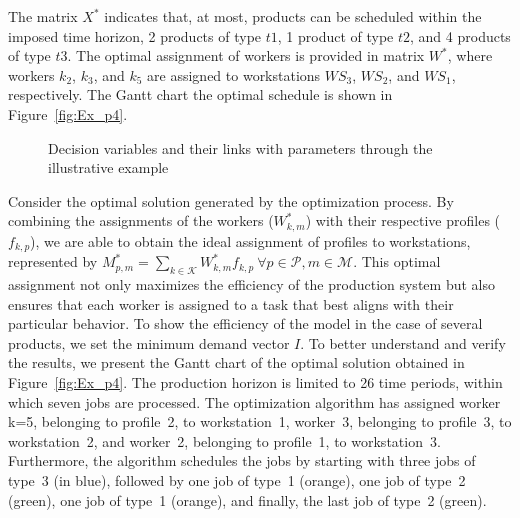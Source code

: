 \documentclass[review,12pt, 3p, times]{elsarticle}
\begin{document}
The matrix $X^*$ indicates that, at most,  products can be scheduled within the imposed time horizon,  2 products of type $t1$, 1 product of type $t2$, and 4 products of type $t3$. The optimal assignment of workers is provided in matrix $W^*$, where workers $k_2$, $k_3$, and $k_5$ are assigned to workstations $\textit{WS}_3$, $\textit{WS}_2$, and $\textit{WS}_1$, respectively. The Gantt chart  the optimal schedule is shown in Figure~\ref{fig:Ex_p4}.

\begin{figure}[htbp]
	\centering
	\caption{Decision variables and their links with parameters through the illustrative example}
	\label{fig:Ex_p3}
\end{figure}
	
Consider the optimal solution generated by the optimization process. By combining the assignments of the workers ($W^*_{k,m}$) with their respective profiles ($f_{k,p}$), we are able to obtain the ideal assignment of profiles to workstations, represented by $M^*_{p,m}=\sum_{k \in\mathcal{K}} W^*_{k,m} f_{k,p} \ \forall{p\in \mathcal{P},m \in \mathcal{M}} $. This optimal assignment not only maximizes the efficiency of the production system but also ensures that each worker is assigned to a task that best aligns with their particular behavior. To show the efficiency of the model in the case of several products, we set the minimum demand vector $I$. 
To better understand and verify the results, we present the Gantt chart of the optimal solution obtained in Figure~\ref{fig:Ex_p4}. The production horizon is limited to 26 time periods, within which seven jobs are processed. The optimization algorithm has assigned worker k=5, belonging to profile~2, to workstation~1, worker~3, belonging to profile~3, to workstation~2, and worker~2, belonging to profile~1, to workstation~3. Furthermore, the algorithm schedules the jobs by starting with three jobs of type~3 (in blue), followed by one job of type~1 (orange), one job of type~2 (green), one job of type~1 (orange), and finally, the last job of type~2 (green).
	
\end{document}
